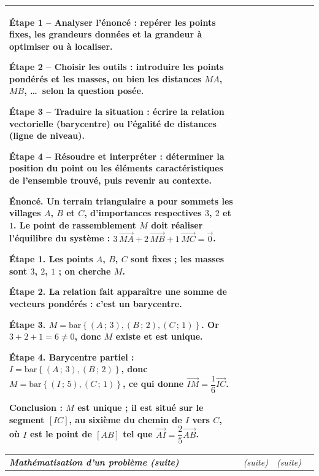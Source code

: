 \documentclass[10pt,a4paper,landscape]{article}
\newcommand{\vc}[1]{\overrightarrow{#1}}                                 %
\newcommand{\barG}[1]{\mathrm{bar}\left\{#1\right\}}                      %
\newcommand{\moment}[1]{\textbf{\itshape #1}}                             %
\begin{document}
{\begin{longtable}{|J{2.12cm}|L{5.17cm}|L{4.37cm}|L{13.64cm}|}
\textbf{Étape 1 -- Analyser l'énoncé} : repérer les points fixes, les grandeurs données et la grandeur à
optimiser ou à localiser.\par
\textbf{Étape 2 -- Choisir les outils} : introduire les points pondérés et les masses, ou bien les distances
$MA$, $MB$, \dots\ selon la question posée.\par
\textbf{Étape 3 -- Traduire la situation} : écrire la relation vectorielle (barycentre) ou l'égalité de
distances (ligne de niveau).\par
\textbf{Étape 4 -- Résoudre et interpréter} : déterminer la position du point ou les éléments caractéristiques
de l'ensemble trouvé, puis revenir au contexte.

\par{}\par\nobreak

\textbf{Énoncé.} Un terrain triangulaire a pour sommets les villages $A$, $B$ et $C$, d'importances respectives
$3$, $2$ et $1$. Le point de rassemblement $M$ doit réaliser l'équilibre du système :
$3\,\vc{MA}+2\,\vc{MB}+1\,\vc{MC}=\vc{0}$.\par
\textbf{Étape 1.} Les points $A$, $B$, $C$ sont fixes ; les masses sont $3$, $2$, $1$ ; on cherche $M$.\par
\textbf{Étape 2.} La relation fait apparaître une somme de vecteurs pondérés : c'est un \textbf{barycentre}.\par
\textbf{Étape 3.} $M=\barG{(A\,;\,3),(B\,;\,2),(C\,;\,1)}$. Or $3+2+1=6\neq 0$, donc $M$ existe et est unique.\par
\textbf{Étape 4.} Barycentre partiel : $I=\barG{(A\,;\,3),(B\,;\,2)}$, donc $M=\barG{(I\,;\,5),(C\,;\,1)}$, ce
qui donne $\vc{IM}=\dfrac{1}{6}\vc{IC}$.\par
\textbf{Conclusion :} $M$ est unique ; il est situé sur le segment $[IC]$, au sixième du chemin de $I$ vers $C$,
où $I$ est le point de $[AB]$ tel que $\vc{AI}=\dfrac{2}{5}\vc{AB}$.
\\
\hline
\moment{Ma\-thé\-ma\-ti\-sa\-tion d'un problème (suite)} &
\par{\centering\itshape (suite)\par} &
\par{\centering\itshape (suite)\par} &
\par{}\par\nobreak


\end{longtable}}
\end{document}
